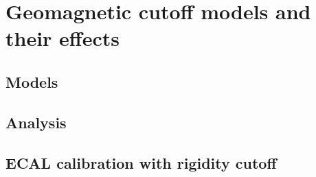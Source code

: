\part{Geomagnetic cutoff models and their effects}

\chapter{Models}

\chapter{Analysis}

\chapter{ECAL calibration with rigidity cutoff}